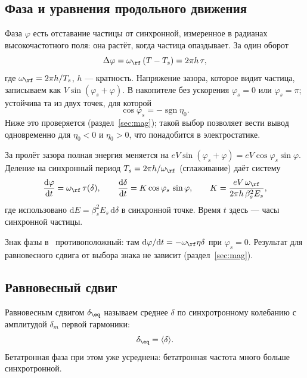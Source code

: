 \subsection{Фаза и уравнения продольного движения}

Фаза $\varphi$ есть отставание частицы от синхронной, измеренное в радианах высокочастотного поля: она растёт, когда частица опаздывает. За один оборот
\begin{equation}
\label{eq:set-phase-map}
\Delta\varphi=\omega_\rf\,(T-T_s)=2\pi h\,\tau,
\end{equation}
где $\omega_\rf=2\pi h/T_s$, $h$ --- кратность. Напряжение зазора, которое видит частица, записываем как $V\sin(\varphi_s+\varphi)$. В накопителе без ускорения $\varphi_s=0$ или $\varphi_s=\pi$; устойчива та из двух точек, для которой
\begin{equation}
\label{eq:set-phis}
\cos\varphi_s=-\operatorname{sgn}\eta_0 .
\end{equation}
Ниже это проверяется (раздел~\ref{sec:mag}); такой выбор позволяет вести вывод одновременно для $\eta_0<0$ и $\eta_0>0$, что понадобится в электростатике.

За пролёт зазора полная энергия меняется на $eV\sin(\varphi_s+\varphi)=eV\cos\varphi_s\sin\varphi$. Деление на синхронный период $T_s=2\pi h/\omega_\rf$ (сглаживание) даёт систему
\begin{equation}
\label{eq:set-system}
\frac{\mathrm{d}\varphi}{\mathrm{d}t}=\omega_\rf\,\tau(\delta),
\qquad
\frac{\mathrm{d}\delta}{\mathrm{d}t}=K\cos\varphi_s\,\sin\varphi,
\qquad
K=\frac{eV\,\omega_\rf}{2\pi h\,\beta_s^2E_s},
\end{equation}
где использовано $\mathrm{d}E=\beta_s^2E_s\,\mathrm{d}\delta$ в синхронной точке. Время $t$ здесь --- часы синхронной частицы.

Знак фазы в~\cite{Senichev2013} противоположный: там $\mathrm{d}\varphi/\mathrm{d}t=-\omega_\rf\eta\delta$ при $\varphi_s=0$. Результат для равновесного сдвига от выбора знака не зависит (раздел~\ref{sec:mag}).

\subsection{Равновесный сдвиг}

Равновесным сдвигом $\delta_\eq$ называем среднее $\delta$ по синхротронному колебанию с амплитудой $\delta_m$ первой гармоники:
\begin{equation}
\label{eq:set-deq}
\delta_\eq=\langle\delta\rangle .
\end{equation}
Бетатронная фаза при этом уже усреднена: бетатронная частота много больше синхротронной.

